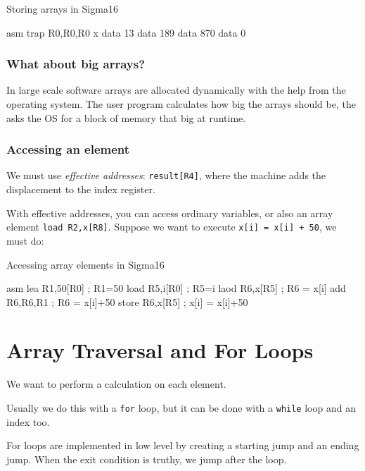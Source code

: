 \begin{highlight}{Storing arrays in Sigma16}
	\begin{code}{asm}
		trap R0,R0,R0
		x data 13
		data 189
		data 870
		data 0
	\end{code}
\end{highlight}

\subsubsection{What about big arrays?}\label{ssub:what_about_big_arrays}

In large scale software arrays are allocated dynamically with the help from the operating system.
The user program calculates how big the arrays should be, the asks the OS for a block of memory that big at runtime.

\subsubsection{Accessing an element}\label{ssub:accessing_an_element}

We must use \emph{effective addresses}: \texttt{result[R4]}, where the machine adds the displacement to the index register.

With effective addresses, you can access ordinary variables, or also an array element \texttt{load R2,x[R8]}.
Suppose we want to execute \texttt{x[i] = x[i] + 50}, we must do:
\begin{highlight}{Accessing array elements in Sigma16}
	\begin{code}{asm}
		lea R1,50[R0] ; R1=50
		load R5,i[R0] ; R5=i
		laod R6,x[R5] ; R6 = x[i]
		add R6,R6,R1 ; R6 = x[i]+50
		store R6,x[R5] ; x[i] = x[i]+50
	\end{code}
\end{highlight}

\section{Array Traversal and For Loops}\label{sec:array_traversal_and_for_loops}

We want to perform a calculation on each element.

Usually we do this with a \texttt{for} loop, but it can be done with a \texttt{while} loop and an index too.

For loops are implemented in low level by creating a starting jump and an ending jump.
When the exit condition is truthy, we jump after the loop.

